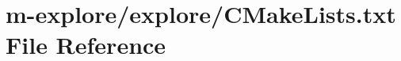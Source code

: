 \hypertarget{CMakeLists_8txt}{}\section{m-\/explore/explore/\+C\+Make\+Lists.txt File Reference}
\label{CMakeLists_8txt}
